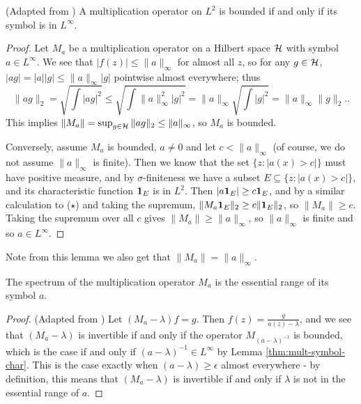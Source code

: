 \documentclass[../main.tex]{subfiles}
\begin{document}
\begin{lemma}\label{thm:mult-symbol-char}
(Adapted from \cite{arveson2002short})
A multiplication operator on $L^2$ is bounded if and only if its symbol is in $L^\infty$.
\end{lemma}
\begin{proof}
Let $M_a$ be a multiplication operator on a Hilbert space $\mathcal{H}$ with symbol $a \in L^\infty$. We see that $|f(z)| \leq \|a\|_\infty$ for almost all $z$, so for any $g \in \mathcal{H}$, $|a g| = |a||g| \leq \|a\|_\infty |g|$ pointwise almost everywhere; thus
\begin{equation*}
\|a g\|_2 = \sqrt{\int |a g|^2} \leq \sqrt{\int \|a\|_\infty^2|g|^2} = \|a\|_\infty \sqrt{\int |g|^2} = \|a\|_\infty \|g\|_2. .\tag{$\star$}
\end{equation*}
This implies $\|M_a\| = \sup_{g \in \mathcal{H}} \|a g\|_2 \leq \|a\|_\infty$, so $M_a$ is bounded.

Conversely, assume $M_a$ is bounded, $a \neq 0$ and let $c < \|a\|_\infty$ (of course, we do not assume $\|a\|_\infty$ is finite). Then we know that the
set $\{z : |a(x) > c|\}$ must have positive measure, and by $\sigma$-finiteness we have a subset $E \subseteq \{z : |a(x) > c|\}$, and its characteristic 
function $\mathbf{1}_E$ is in $L^2$. Then $|a \mathbf{1}_E| \geq c \mathbf{1}_E$, and by a similar calculation to ($\star$) and taking the supremum, $\|M_a  \mathbf{1}_E\|_2 \geq c \|\mathbf{1}_E\|_2$, so $\|M_a\| \geq c$. Taking the supremum over all $c$ gives $\|M_a\| \geq \|a\|_\infty$, so $\|a\|_\infty$ is finite and so $a \in L^\infty$.
\end{proof}

Note from this lemma we also get that $\|M_a\| = \|a\|_\infty$.

\begin{theorem}\label{thm:mult-op-spec}
  The spectrum of the multiplication operator $M_a$ is the essential range of its symbol $a$.
\end{theorem}
\begin{proof}
(Adapted from \cite{garcia2023operator})
Let $(M_a - \lambda)f = g$. Then $f(z) = \frac{g}{a(z) - \lambda}$, and we see that $(M_a - \lambda)$ is invertible if and only if the operator
$M_{(a - \lambda)^{-1}}$ is bounded, which is the case if and only if $(a - \lambda)^{-1} \in L^\infty$ by Lemma \ref{thm:mult-symbol-char}.
This is the case exactly when $(a - \lambda) \geq \epsilon$ almost everywhere - by definition, this means that $(M_a - \lambda)$ is invertible if and
only if $\lambda$ is not in the essential range of $a$.
\end{proof}
\end{document}
